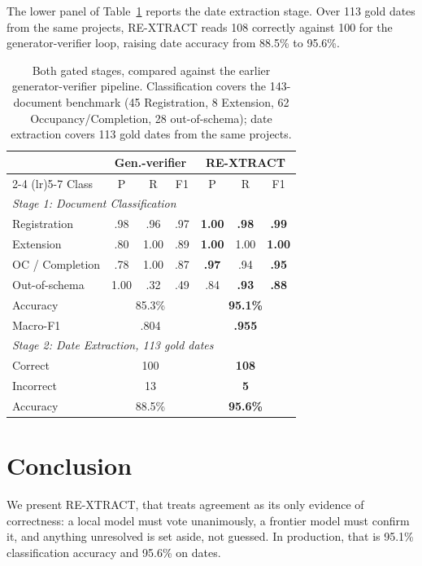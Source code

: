 \documentclass[letterpaper]{article} %
\newcommand{\sys}{RE-XTRACT}
\begin{document}
The lower panel of Table~\ref{tab:results} reports the date extraction stage. Over 113 gold dates from the
same projects, \sys{} reads 108 correctly against 100 for the
generator-verifier loop, raising date accuracy from 88.5\% to 95.6\%.


\begin{table}[t]
\centering
{\small
\begin{tabular}{lcccccc}
\toprule
& \multicolumn{3}{c}{Gen.-verifier} & \multicolumn{3}{c}{\sys} \\
\cmidrule(lr){2-4} \cmidrule(lr){5-7}
Class & P & R & F1 & P & R & F1 \\
\midrule
\multicolumn{7}{l}{\emph{Stage 1: Document Classification}} \\
Registration     & .98 & .96  & .97 & \textbf{1.00} & \textbf{.98} & \textbf{.99} \\
Extension        & .80 & 1.00 & .89 & \textbf{1.00} & 1.00 & \textbf{1.00} \\
OC / Completion  & .78 & 1.00 & .87 & \textbf{.97} & .94 & \textbf{.95} \\
Out-of-schema    & 1.00 & .32 & .49 & .84 & \textbf{.93} & \textbf{.88} \\
\midrule
Accuracy & \multicolumn{3}{c}{85.3\%} & \multicolumn{3}{c}{\textbf{95.1\%}} \\
Macro-F1 & \multicolumn{3}{c}{.804} & \multicolumn{3}{c}{\textbf{.955}} \\
\midrule
\multicolumn{7}{l}{\emph{Stage 2: Date Extraction, 113 gold dates}} \\
Correct       & \multicolumn{3}{c}{100}    & \multicolumn{3}{c}{\textbf{108}} \\
Incorrect     & \multicolumn{3}{c}{13}     & \multicolumn{3}{c}{\textbf{5}} \\
Accuracy      & \multicolumn{3}{c}{88.5\%} & \multicolumn{3}{c}{\textbf{95.6\%}} \\
\bottomrule
\end{tabular}}
\caption{Both gated stages, compared against the earlier generator-verifier
pipeline. Classification covers the 143-document benchmark (45 Registration, 8
Extension, 62 Occupancy/Completion, 28 out-of-schema); date extraction covers
113 gold dates from the same projects.}
\label{tab:results}
\end{table}



\section{Conclusion}

We present \sys{}, that treats agreement as its only evidence of correctness: a local
model must vote unanimously, a frontier model must confirm it, and anything
unresolved is set aside, not guessed. In production, that is 95.1\%
classification accuracy and 95.6\% on dates.


\end{document}
